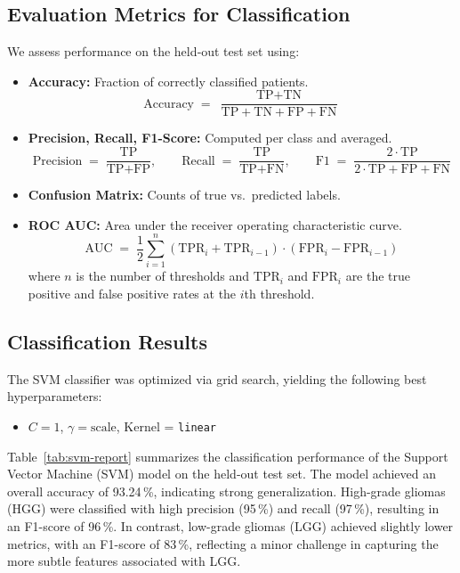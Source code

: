 \subsection{Evaluation Metrics for Classification}
We assess performance on the held‐out test set using:
\begin{itemize}
  \item \textbf{Accuracy:} Fraction of correctly classified patients.
        \[
          \text{Accuracy} \;=\; \frac{\text{TP} + \text{TN}}{\text{TP} + \text{TN} + \text{FP} + \text{FN}}
        \]
  \item \textbf{Precision, Recall, F1-Score:} Computed per class and averaged.
        \[
          \text{Precision} \;=\; \frac{\text{TP}}{\text{TP} + \text{FP}}, \qquad
          \text{Recall} \;=\; \frac{\text{TP}}{\text{TP} + \text{FN}}, \qquad
          \text{F1} \;=\; \frac{2 \cdot \text{TP}}{2 \cdot \text{TP} + \text{FP} + \text{FN}}
        \]
  \item \textbf{Confusion Matrix:} Counts of true vs.\ predicted labels.
  \item \textbf{ROC AUC:} Area under the receiver operating characteristic curve.
        \[
          \text{AUC} \;=\; \frac{1}{2} \sum_{i=1}^{n} (\text{TPR}_{i} + \text{TPR}_{i-1}) \cdot (\text{FPR}_{i} - \text{FPR}_{i-1})
        \]
        where $n$ is the number of thresholds and $\text{TPR}_i$ and $\text{FPR}_i$ are the true positive and false positive rates at the $i$th threshold.
\end{itemize}

\subsection{Classification Results}
\label{sec:classification-results}

The SVM classifier was optimized via grid search, yielding the following best hyperparameters:
\begin{itemize}
  \item \(C = 1\), \(\gamma = \text{scale}\), Kernel = \texttt{linear}
\end{itemize}

Table~\ref{tab:svm-report} summarizes the classification performance of the Support Vector Machine (SVM) model on the held-out test set. The model achieved an overall accuracy of 93.24\,\%, indicating strong generalization. High-grade gliomas (HGG) were classified with high precision (95\,\%) and recall (97\,\%), resulting in an F1-score of 96\,\%. In contrast, low-grade gliomas (LGG) achieved slightly lower metrics, with an F1-score of 83\,\%, reflecting a minor challenge in capturing the more subtle features associated with LGG.

